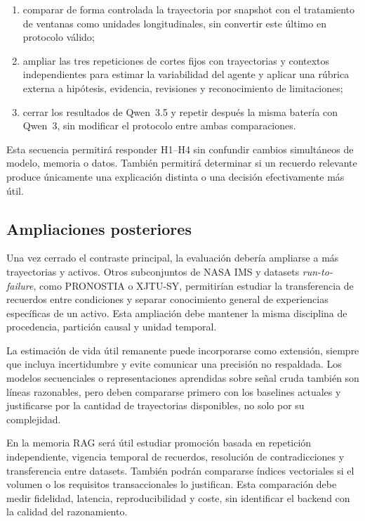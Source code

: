 \begin{enumerate}
        efectiva en el paquete auditable;
  \item comparar de forma controlada la trayectoria por snapshot con el
        tratamiento de ventanas como unidades longitudinales, sin convertir este
        último en protocolo válido;
  \item ampliar las tres repeticiones de cortes fijos con trayectorias y
        contextos independientes para estimar la variabilidad del agente y
        aplicar una rúbrica externa a hipótesis, evidencia, revisiones y
        reconocimiento de limitaciones;
  \item cerrar los resultados de Qwen~3.5 y repetir después la misma batería con
        Qwen~3, sin modificar el protocolo entre ambas comparaciones.
\end{enumerate}

Esta secuencia permitirá responder H1--H4 sin confundir cambios simultáneos de
modelo, memoria o datos. También permitirá determinar si un recuerdo relevante
produce únicamente una explicación distinta o una decisión efectivamente más
útil.

\subsection{Ampliaciones posteriores}

Una vez cerrado el contraste principal, la evaluación debería ampliarse a más
trayectorias y activos. Otros subconjuntos de NASA IMS y datasets
\textit{run-to-failure}, como PRONOSTIA o XJTU-SY, permitirían estudiar la
transferencia de recuerdos entre condiciones y separar conocimiento general de
experiencias específicas de un activo. Esta ampliación debe mantener la misma
disciplina de procedencia, partición causal y unidad temporal.

La estimación de vida útil remanente puede incorporarse como extensión, siempre
que incluya incertidumbre y evite comunicar una precisión no respaldada. Los
modelos secuenciales o representaciones aprendidas sobre señal cruda también
son líneas razonables, pero deben compararse primero con los baselines actuales
y justificarse por la cantidad de trayectorias disponibles, no solo por su
complejidad.

En la memoria RAG será útil estudiar promoción basada en repetición
independiente, vigencia temporal de recuerdos, resolución de contradicciones y
transferencia entre datasets. También podrán compararse índices vectoriales si
el volumen o los requisitos transaccionales lo justifican. Esta comparación
debe medir fidelidad, latencia, reproducibilidad y coste, sin identificar el
backend con la calidad del razonamiento.


